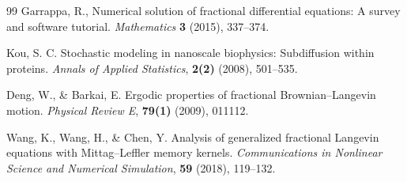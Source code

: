 \documentclass[11pt]{article}
\numberwithin{equation}{section}
\begin{document}
{\begin{thebibliography}{99}
Garrappa, R.,
Numerical solution of fractional differential equations:
A survey and software tutorial.
\textit{Mathematics}
\textbf{3} (2015), 337--374.


Kou, S. C.
Stochastic modeling in nanoscale biophysics:
Subdiffusion within proteins.
\emph{Annals of Applied Statistics},
\textbf{2(2)} (2008), 501--535.


Deng, W., \& Barkai, E.
Ergodic properties of fractional Brownian--Langevin motion.
\emph{Physical Review E},
\textbf{79(1)} (2009), 011112.



Wang, K., Wang, H., \& Chen, Y.
Analysis of generalized fractional Langevin equations with Mittag--Leffler memory kernels.
\emph{Communications in Nonlinear Science and Numerical Simulation},
\textbf{59} (2018), 119--132.




\end{thebibliography}
}
\end{document}

